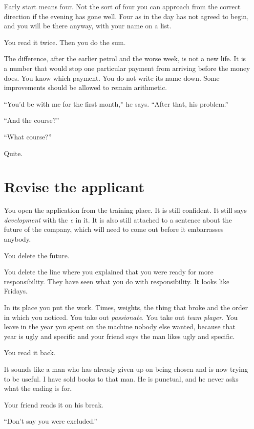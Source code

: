 \documentclass[11pt,oneside]{book}
\begin{document}
Early start means four. Not the sort of four you can approach from the correct direction if the evening has gone well. Four as in the day has not agreed to begin, and you will be there anyway, with your name on a list.

You read it twice. Then you do the sum.

The difference, after the earlier petrol and the worse week, is not a new life. It is a number that would stop one particular payment from arriving before the money does. You know which payment. You do not write its name down. Some improvements should be allowed to remain arithmetic.

``You'd be with me for the first month,'' he says. ``After that, his problem.''

``And the course?''

``What course?''

Quite.

\section*{Revise the applicant}

You open the application from the training place. It is still confident. It still says \emph{development} with the \emph{e} in it. It is also still attached to a sentence about the future of the company, which will need to come out before it embarrasses anybody.

You delete the future.

You delete the line where you explained that you were ready for more responsibility. They have seen what you do with responsibility. It looks like Fridays.

In its place you put the work. Times, weights, the thing that broke and the order in which you noticed. You take out \emph{passionate}. You take out \emph{team player}. You leave in the year you spent on the machine nobody else wanted, because that year is ugly and specific and your friend says the man likes ugly and specific.

You read it back.

It sounds like a man who has already given up on being chosen and is now trying to be useful. I have sold books to that man. He is punctual, and he never asks what the ending is for.

Your friend reads it on his break.

``Don't say you were excluded.''
\end{document}
